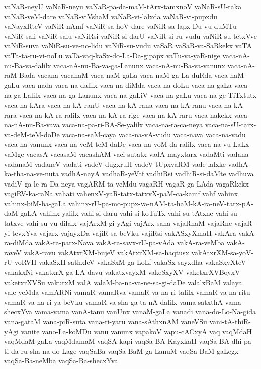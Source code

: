 {vaNaR-neyU
vaNaR-neyu
vaNaR-pa-da-maM-tArx-tamxnoV
vaNaR-sU-taka
vaNaR-veM-dare
vaNaR-viVshaM
vaNaR-vi-lalxda
vaNaR-vi-pupxdu
vaNayxRteV
vaNiR-nAmf
vaNiR-sa-hoV-dare
vaNiR-sa-lapx-Du-vu-duMTu
vaNiR-sali
vaNiR-salu
vaNiRsi
vaNiR-si-darU
vaNiR-si-ru-vudu
vaNiR-su-tetxVve
vaNiR-suva
vaNiR-su-ve-no-lidu
vaNiR-su-vudu
vaSaR
vaSaR-va-SaRkekx
vaTA
vaTa-ta-ru-vi-noLu
vaTa-vaq-kaSx-do-La-Da-gipapx
vaTu-va-yaR-nige
vaca-nA-nu-Ba-va-dalilx
vaca-nA-nu-Ba-va-ga-Lanunx
vaca-nA-nu-Ba-va-vanunx
vaca-nA-raM-Bada
vacana
vacanaM
vaca-naM-gaLa
vaca-naM-ga-La-duRda
vaca-naM-gaLu
vaca-nada
vaca-na-dalilx
vaca-na-diMda
vaca-na-doLu
vaca-na-gaLa
vaca-na-ga-Lalilx
vaca-na-ga-Lanunx
vaca-na-gaLiV
vaca-na-gaLu
vaca-na-ge-TiTxtutx
vaca-na-kAra
vaca-na-kA-ranU
vaca-na-kA-rana
vaca-na-kA-ranu
vaca-na-kA-rara
vaca-na-kA-ra-ralilx
vaca-na-kA-ra-rige
vaca-na-kA-raru
vaca-nakekx
vaca-na-nA-nu-Ba-vava
vaca-na-pa-ri-BA-Se-yalilx
vaca-na-ra-ca-neya
vaca-na-sU-tarx-va-deM-teM-doDe
vaca-na-saM-caya
vaca-na-vA-vudu
vaca-nava
vaca-na-vadu
vaca-na-vanunx
vaca-na-veM-teM-daDe
vaca-na-voM-da-ralilx
vaca-na-vu-LaLx-vaMge
vacasA
vacasaM
vacashAM
vaci-sutatx
vadA-mayxtarx
vadaMti
vadana
vadanaM
vadaneV
vadati
vadeV-dugxruH
vadeV-tUpxvaRM
vade-lalxke
vadhA-ka-tha-na-ve-nuta
vadhA-nayA
vadhaR-yeVtf
vadhiRsi
vadhiR-si-daMte
vadhuva
vadiV-ga-le-ra-Da-neya
vagARM-ta-veMdu
vagaRH
vagaR-ga-LAda
vagaRkekx
vagiRV-ka-raNa
vahati
vahenxV-yaR-tatx-tatxvX-paM-ca-kamf
vahf
vahinx
vahinx-biM-ba-gaLa
vahinx-rU-pa-mo-pupx-va-nAM-ta-haM-kA-ra-neV-tarx-pA-daM-gaLA
vahinx-yalilx
vahi-si-daru
vahi-si-koTuTx
vahi-su-tAtxne
vahi-su-tatxve
vahi-su-vu-dilalx
vajArxM-gi-yAgi
vajArx-sana
vajaRnaM
vajaRne
vajaR-yi-tevxYva
vajarx
vajayxDa
vajiR-sa-beVku
vajiRsi
vakASxyXmaH
vakAra
vakA-ra-diMda
vakA-ra-parx-Nava
vakA-ra-savx-rU-pa-vAda
vakA-ra-veMba
vakA-raveV
vakA-ravu
vakAtxrXM-bujeV
vakAtxrXM-sa-haqtusx
vakAtxrXM-sa-yoV-rU-voRVH
vakaSxH-sathxleV
vakaSxM-ga-LoLf
vakaSx-sayxdha
vakaSxyXteV
vakakxNi
vakatxrX-ga-LA-davu
vakatxvayxM
vakeSxyXV
vaketxrXVBoyxV
vaketxrXVSu
vakutxM
valA
valaM-ba-na-va-ne-sa-gi-daDe
valalxBaM
valaya
vale-yeMda
vamARNi
vamaR
vamaRva
vamaR-va-na-ri-talilx
vamaR-va-na-ritu
vamaR-va-na-ri-ya-beVku
vamaR-va-sha-ga-ta-nA-dalilx
vama-satxthA
vama-shecxYva
vama-vama
vanA-tanu
vanUnx
vanaM-gaLa
vanadi
vana-do-Lo-Na-gida
vana-gataM
vana-piR-suta
vana-ri-yaru
vana-sAthxnAM
vaneVSu
vani-tA-thiR-yAgi
vanite
vano-La-koMDu
vanu
vanunx
vapakoV
vapu-cACxyA
vaq
vaqMdaH
vaqMdaM-gaLa
vaqMdamaM
vaqSA-kapi
vaqSa-BA-KayxkaH
vaqSa-BA-dhi-pa-ti-da-ru-sha-na-do-Lage
vaqSaBa
vaqSa-BaM-ga-LanuM
vaqSa-BaM-gaLegx
vaqSa-Ba-neMba
vaqSa-Ba-shecxYva
}
